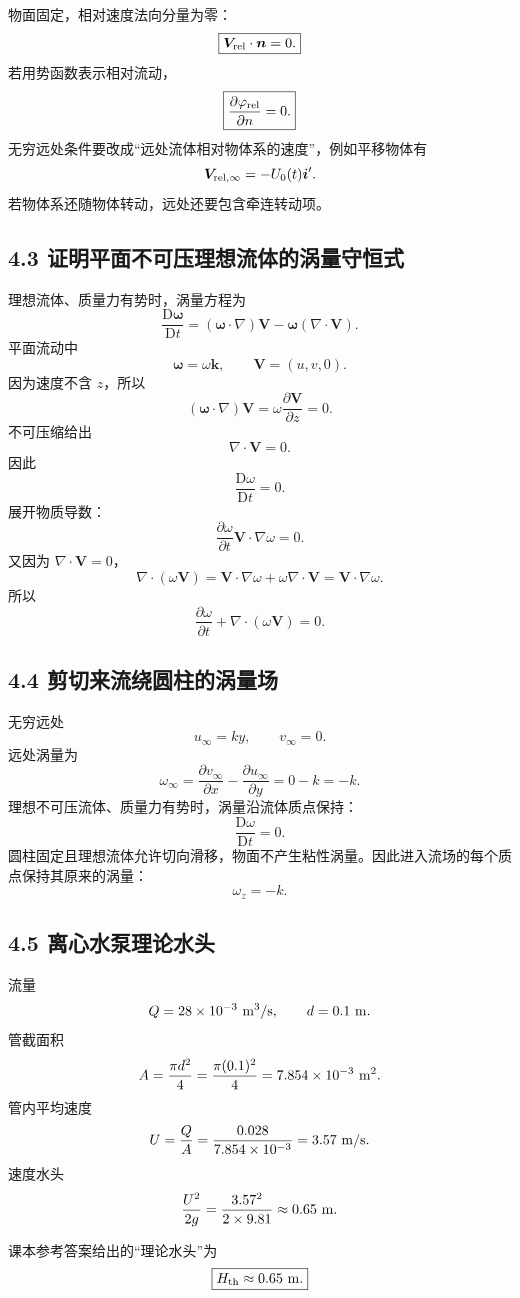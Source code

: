 \documentclass[UTF8,zihao=-4]{ctexart}
\newcommand{\D}{\mathrm D}
\begin{document}
物面固定，相对速度法向分量为零：
\[
\boxed{\bm V_{\rm rel}\cdot\bm n=0.}
\]
若用势函数表示相对流动，
\[
\boxed{\frac{\partial\varphi_{\rm rel}}{\partial n}=0.}
\]
无穷远处条件要改成“远处流体相对物体系的速度”，例如平移物体有
\[
\bm V_{\rm rel,\infty}=-U_0(t)\bm i'.
\]
若物体系还随物体转动，远处还要包含牵连转动项。

\subsection*{4.3 证明平面不可压理想流体的涡量守恒式}

理想流体、质量力有势时，涡量方程为
\[
\frac{\D\bm\omega}{\D t}
=(\bm\omega\cdot\nabla)\bm V-\bm\omega(\nabla\cdot\bm V).
\]
平面流动中
\[
\bm\omega=\omega\bm k,\qquad
\bm V=(u,v,0).
\]
因为速度不含 \(z\)，所以
\[
(\bm\omega\cdot\nabla)\bm V=\omega\frac{\partial\bm V}{\partial z}=0.
\]
不可压缩给出
\[
\nabla\cdot\bm V=0.
\]
因此
\[
\frac{\D\omega}{\D t}=0.
\]
展开物质导数：
\[
\frac{\partial\omega}{\partial t}
\bm V\cdot\nabla\omega=0.
\]
又因为 \(\nabla\cdot\bm V=0\)，
\[
\nabla\cdot(\omega\bm V)
=\bm V\cdot\nabla\omega+\omega\nabla\cdot\bm V
=\bm V\cdot\nabla\omega.
\]
所以
\[
\boxed{
\frac{\partial\omega}{\partial t}
+\nabla\cdot(\omega\bm V)=0.}
\]

\subsection*{4.4 剪切来流绕圆柱的涡量场}

无穷远处
\[
u_\infty=ky,\qquad v_\infty=0.
\]
远处涡量为
\[
\omega_\infty
=\frac{\partial v_\infty}{\partial x}
-\frac{\partial u_\infty}{\partial y}
=0-k=-k.
\]
理想不可压流体、质量力有势时，涡量沿流体质点保持：
\[
\frac{\D\omega}{\D t}=0.
\]
圆柱固定且理想流体允许切向滑移，物面不产生粘性涡量。因此进入流场的每个质点保持其原来的涡量：
\[
\boxed{\omega_z=-k.}
\]

\subsection*{4.5 离心水泵理论水头}

流量
\[
Q=28\times10^{-3}\ {\rm m^3/s},
\qquad d=0.1\ {\rm m}.
\]
管截面积
\[
A=\frac{\pi d^2}{4}
=\frac{\pi(0.1)^2}{4}
=7.854\times10^{-3}\ {\rm m^2}.
\]
管内平均速度
\[
U=\frac QA
=\frac{0.028}{7.854\times10^{-3}}
=3.57\ {\rm m/s}.
\]
速度水头
\[
\frac{U^2}{2g}
=\frac{3.57^2}{2\times9.81}
\approx0.65\ {\rm m}.
\]

课本参考答案给出的“理论水头”为
\[
\boxed{H_{\rm th}\approx0.65\ {\rm m}.}
\]
\end{document}
